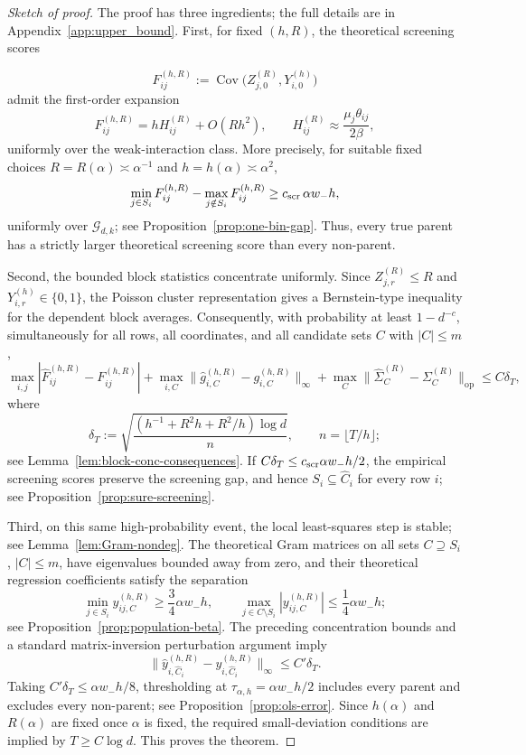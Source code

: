 \documentclass{article}
\newcommand{\Cov}{\operatorname{Cov}}
\newcommand{\op}{\mathrm{op}}
\begin{document}
\begin{proof}[Sketch of proof] The proof has three ingredients; the full details are in Appendix~\ref{app:upper_bound}. First, for fixed $(h,R)$, the theoretical screening scores

\[
F^{(h,R)}_{ij}:=\Cov\bigl(Z^{(R)}_{j,0},Y^{(h)}_{i,0}\bigr)
\]
admit the first-order expansion
\[
F^{(h,R)}_{ij}=hH^{(R)}_{ij}+O(Rh^2),
\qquad
H^{(R)}_{ij}\approx \frac{\mu_j\theta_{ij}}{2\beta},
\]
uniformly over the weak-interaction class. More precisely,
for suitable fixed choices
\(R=R(\alpha)\asymp \alpha^{-1}\) and
\(h=h(\alpha)\asymp \alpha^2\),
\[
\min_{j\in S_i}F_{ij}^{(h,R)}
-
\max_{j\notin S_i}F_{ij}^{(h,R)}
\ge c_{\rm scr}\,\alpha w_- h ,
\]
uniformly over \(\mathcal G_{d,k}\); see Proposition~\ref{prop:one-bin-gap}. Thus, every true parent has a strictly
larger theoretical screening score than every non-parent.

Second, the bounded block statistics concentrate uniformly. Since
\(Z_{j,r}^{(R)}\le R\) and \(Y_{i,r}^{(h)}\in\{0,1\}\), the Poisson cluster
representation gives a Bernstein-type inequality for the dependent block
averages. Consequently, with probability at least \(1-d^{-c}\), simultaneously
for all rows, all coordinates, and all candidate sets \(C\) with \(|C|\le m\),
\[
\max_{i,j}|\widehat F_{ij}^{(h,R)}-F_{ij}^{(h,R)}|
+
\max_{i,C}\|\widehat g_{i,C}^{(h,R)}-g_{i,C}^{(h,R)}\|_\infty
+
\max_C\|\widehat\Sigma_C^{(R)}-\Sigma_C^{(R)}\|_{\op}
\le C\delta_T,
\]
where
\[
\delta_T:=
\sqrt{\frac{(h^{-1}+R^2h+R^2/h)\log d}{n}},
\qquad n=\lfloor T/h\rfloor ;
\]
see Lemma~\ref{lem:block-conc-consequences}. If \(C\delta_T\le c_{\rm scr}\alpha w_- h/2\), the empirical screening scores
preserve the screening gap, and hence \(S_i\subseteq \widehat C_i\) for every
row \(i\); see Proposition~\ref{prop:sure-screening}.

Third, on this same high-probability event, the local least-squares step is
stable; see Lemma~\ref{lem:Gram-nondeg}. The theoretical Gram matrices on all sets \(C\supseteq S_i\),
\(|C|\le m\), have eigenvalues bounded away from zero, and their theoretical
regression coefficients satisfy the separation
\[
\min_{j\in S_i} y^{(h,R)}_{ij,C}\ge \frac34\alpha w_- h,
\qquad
\max_{j\in C\setminus S_i}|y^{(h,R)}_{ij,C}|
\le \frac14\alpha w_- h ;
\]
see Proposition~\ref{prop:population-beta}. The preceding concentration bounds and a standard matrix-inversion perturbation
argument imply
\[
\|\widehat y^{(h,R)}_{i,\widehat C_i}
      -y^{(h,R)}_{i,\widehat C_i}\|_\infty
\le C'\delta_T .
\]
Taking \(C'\delta_T\le \alpha w_- h/8\), thresholding at
\(\tau_{\alpha,h}=\alpha w_- h/2\) includes every parent and excludes every
non-parent; see Proposition~\ref{prop:ols-error}. Since \(h(\alpha)\) and \(R(\alpha)\) are fixed once \(\alpha\) is
fixed, the required small-deviation conditions are implied by
\(T\ge  C\log d\). This proves the theorem.
\end{proof}
\end{document}
